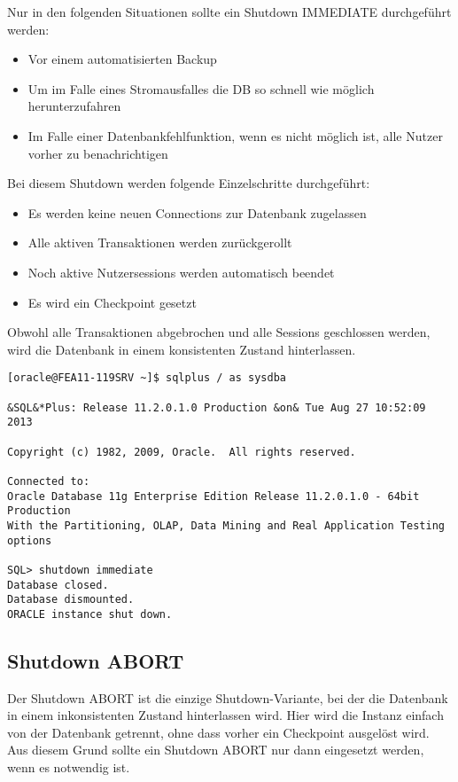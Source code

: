         Nur in den folgenden Situationen sollte ein Shutdown IMMEDIATE durchgef\"uhrt werden:
        \begin{itemize}
          \item Vor einem automatisierten Backup
          \item Um im Falle eines Stromausfalles die DB so schnell wie m\"oglich herunterzufahren
          \item Im Falle einer Datenbankfehlfunktion, wenn es nicht m\"oglich ist, alle Nutzer vorher zu benachrichtigen
        \end{itemize}
        Bei diesem Shutdown werden folgende Einzelschritte durchgef\"uhrt:
        \begin{itemize}
          \item Es werden keine neuen Connections zur Datenbank zugelassen
          \item Alle aktiven Transaktionen werden zur\"uckgerollt
          \item Noch aktive Nutzersessions werden automatisch beendet
          \item Es wird ein Checkpoint gesetzt
        \end{itemize}
        \begin{merke}
          Obwohl alle Transaktionen abgebrochen und alle Sessions geschlossen werden, wird die Datenbank in einem konsistenten Zustand hinterlassen.
        \end{merke}
        \begin{lstlisting}[caption={Durchf\"uhren eines Shutdown IMMEDIATE},label=admin12,language=sqlplus]
[oracle@FEA11-119SRV ~]$ sqlplus / as sysdba

&SQL&*Plus: Release 11.2.0.1.0 Production &on& Tue Aug 27 10:52:09 2013

Copyright (c) 1982, 2009, Oracle.  All rights reserved.

Connected to:
Oracle Database 11g Enterprise Edition Release 11.2.0.1.0 - 64bit Production
With the Partitioning, OLAP, Data Mining and Real Application Testing options

SQL> shutdown immediate
Database closed.
Database dismounted.
ORACLE instance shut down.
        \end{lstlisting}
      \subsection{Shutdown ABORT}
        Der Shutdown ABORT ist die einzige Shutdown-Variante, bei der die
        Datenbank in einem inkonsistenten Zustand hinterlassen wird. Hier wird
        die Instanz einfach von der Datenbank getrennt, ohne dass vorher ein
        Checkpoint ausgel\"ost wird. Aus diesem Grund sollte ein Shutdown ABORT
        nur dann eingesetzt werden, wenn es notwendig ist.

